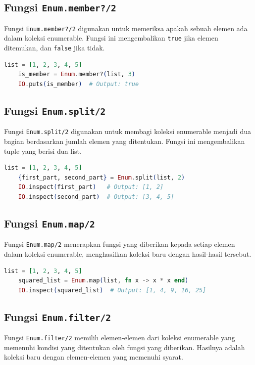 \subsection{Fungsi \texttt{Enum.member?/2}}

Fungsi \texttt{Enum.member?/2} digunakan untuk memeriksa apakah sebuah elemen ada dalam koleksi enumerable. Fungsi ini mengembalikan \texttt{true} jika elemen ditemukan, dan \texttt{false} jika tidak.

\begin{lstlisting}[language=Elixir]
	list = [1, 2, 3, 4, 5]
	is_member = Enum.member?(list, 3)
	IO.puts(is_member)  # Output: true
\end{lstlisting}

\subsection{Fungsi \texttt{Enum.split/2}}

Fungsi \texttt{Enum.split/2} digunakan untuk membagi koleksi enumerable menjadi dua bagian berdasarkan jumlah elemen yang ditentukan. Fungsi ini mengembalikan tuple yang berisi dua list.

\begin{lstlisting}[language=Elixir]
	list = [1, 2, 3, 4, 5]
	{first_part, second_part} = Enum.split(list, 2)
	IO.inspect(first_part)   # Output: [1, 2]
	IO.inspect(second_part)  # Output: [3, 4, 5]
\end{lstlisting}

\subsection{Fungsi \texttt{Enum.map/2}}

Fungsi \texttt{Enum.map/2} menerapkan fungsi yang diberikan kepada setiap elemen dalam koleksi enumerable, menghasilkan koleksi baru dengan hasil-hasil tersebut.

\begin{lstlisting}[language=Elixir]
	list = [1, 2, 3, 4, 5]
	squared_list = Enum.map(list, fn x -> x * x end)
	IO.inspect(squared_list)  # Output: [1, 4, 9, 16, 25]
\end{lstlisting}

\subsection{Fungsi \texttt{Enum.filter/2}}

Fungsi \texttt{Enum.filter/2} memilih elemen-elemen dari koleksi enumerable yang memenuhi kondisi yang ditentukan oleh fungsi yang diberikan. Hasilnya adalah koleksi baru dengan elemen-elemen yang memenuhi syarat.


